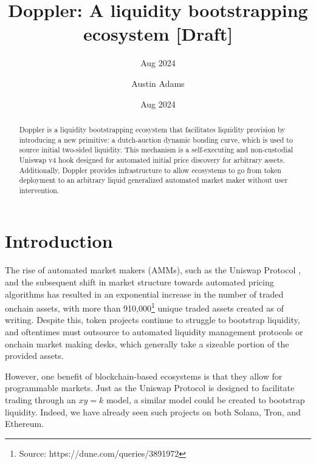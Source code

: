 \documentclass[sigconf,nonacm,prologue,table]{acmart}
\numberwithin{equation}{section}
\theoremstyle{definition}
\theoremstyle{remark}
\begin{document}
\title{Doppler: A liquidity bootstrapping ecosystem [Draft]}
\subtitle{Aug 2024}
\date{Aug 2024}

\author{Austin Adams}
\affiliation{}

\begin{teaserfigure}
\caption*{
    \hspace{\textwidth}
    }
\end{teaserfigure}

\renewcommand{\shortauthors}{Adams}

\begin{abstract}
Doppler is a liquidity bootstrapping ecosystem that facilitates liquidity provision by introducing a new primitive: a dutch-auction dynamic bonding curve, which is used to source initial two-sided liquidity. This mechanism is a self-executing and non-custodial Uniswap v4 hook designed for automated initial price discovery for arbitrary assets. Additionally, Doppler provides infrastructure to allow ecosystems to go from token deployment to an arbitrary liquid generalized automated market maker without user intervention.
\end{abstract}

\maketitle

\section{Introduction} \label{sec:introduction}
The rise of automated market makers (AMMs), such as the Uniswap Protocol \cite{Adams21}, and the subsequent shift in market structure towards automated pricing algorithms has resulted in an exponential increase in the number of traded onchain assets, with more than 910,000\footnote{Source: https://dune.com/queries/3891972} unique traded assets created as of writing. Despite this, token projects continue to struggle to bootstrap liquidity, and oftentimes must outsource to automated liquidity management protocols or onchain market making desks, which generally take a sizeable portion of the provided assets. 

However, one benefit of blockchain-based ecosystems is that they allow for programmable markets. Just as the Uniswap Protocol is designed to facilitate trading through an $xy=k$ model, a similar model could be created to bootstrap liquidity. Indeed, we have already seen such projects on both Solana, Tron, and Ethereum.
\end{document}
